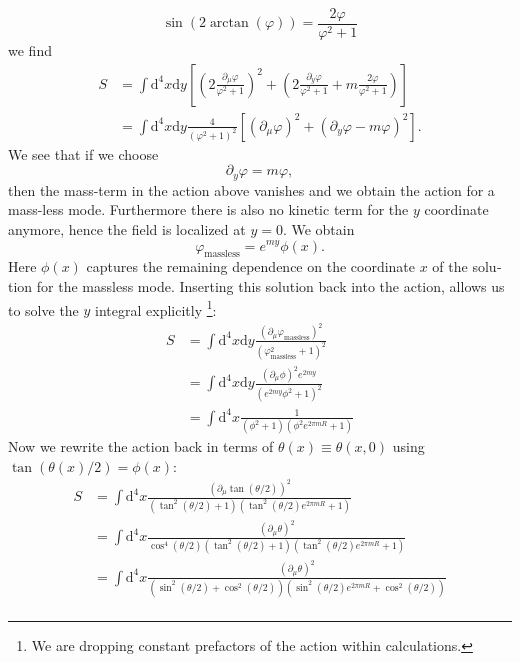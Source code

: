 \documentclass[master,       %
               twoside,        %
               BCOR10mm,       %
               english,ngerman, %
               ]{GAUBM}
\begin{document}
\begin{otherlanguage}{english}
\begin{equation}
	\sin(2 \arctan(\varphi)) = \frac{2 \varphi}{\varphi^2 + 1}
\end{equation}
we find
\begin{align}
    S &= \int \mathrm{d}^4 x \mathrm{d} y \left[
    \left(2 \frac{\partial_\mu \varphi}{\varphi^2 + 1} \right)^2 +
    \left(2 \frac{\partial_y \varphi}{\varphi^2 + 1} + m \frac{2 \varphi}{\varphi^2 + 1} \right) \right] \nonumber \\
    &= \int \mathrm{d}^4 x \mathrm{d} y  \frac{4}{(\varphi^2 + 1)^2}
    \left[ (\partial_\mu \varphi)^2 + (\partial_y \varphi - m \varphi)^2 \right].
\end{align}
We see that if we choose
\begin{equation}
	\partial_y \varphi = m \varphi,
\end{equation}
then the mass-term in the action above vanishes and we obtain the action for a mass-less mode. Furthermore there is also no kinetic term for the $y$ coordinate anymore, hence the field is localized at $y = 0$.
We obtain
\begin{equation}
	\varphi_{\mathrm{massless}} = e^{my} \phi(x).
\end{equation}
Here $\phi(x)$ captures the remaining dependence on the coordinate $x$ of the solution for the massless mode.
Inserting this solution back into the action, allows us to solve the $y$ integral explicitly \footnote{We are dropping constant prefactors of the action within calculations.}:
\begin{align}
	S &= \int \mathrm{d}^4 x \mathrm{d} y  \frac{(\partial_\mu \varphi_{\mathrm{massless}})^2}{(\varphi_{\mathrm{massless}}^2 + 1)^2} \nonumber \\
	&= \int \mathrm{d}^4 x \mathrm{d} y  \frac{(\partial_\mu \phi)^2 e^{2my}}{(e^{2my} \phi^2 + 1)^2} \nonumber \\
	&= \int \mathrm{d}^4 x\frac{1}{(\phi^2 + 1)(\phi^2 e^{2\pi m R} + 1)}
\end{align}
Now we rewrite the action back in terms of $\theta(x) \equiv \theta(x, 0)$ using $\tan(\theta(x)/2) = \phi(x)$:
\begin{align}
	 S &= \int \mathrm{d}^4 x \frac{(\partial_\mu \tan(\theta / 2))^2}{(\tan^2(\theta / 2) + 1)(\tan^2(\theta / 2) e^{2\pi m R} + 1)} \nonumber \\
	 &= \int \mathrm{d}^4 x \frac{(\partial_\mu \theta)^2}{\cos^4(\theta/2)(\tan^2(\theta / 2) + 1)(\tan^2(\theta / 2) e^{2\pi m R} + 1)} \nonumber \\
	 &= \int \mathrm{d}^4 x \frac{(\partial_\mu \theta)^2}{(\sin^2(\theta / 2) + \cos^2(\theta/2))(\sin^2(\theta / 2) e^{2\pi m R} + \cos^2(\theta / 2))} \nonumber \\

\end{align}
\end{otherlanguage}
\end{document}
